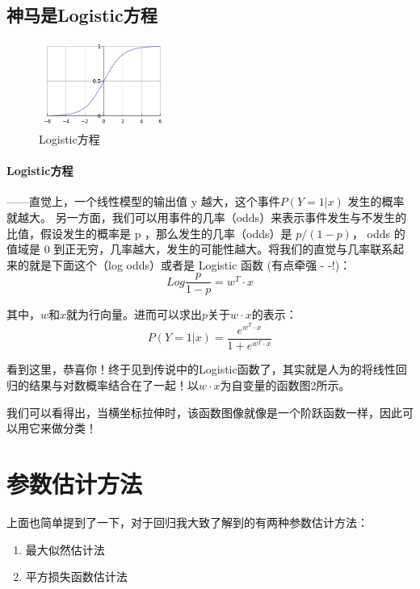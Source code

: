 \documentclass[a4paper, 11pt, UTF8]{ctexart} %
\begin{document}


\subsection{神马是Logistic方程}

\begin{figure}[H]
\centering
\includegraphics[width=0.38\textwidth,height=0.38\textwidth]{2.png}
\caption{Logistic方程}
\end{figure}
\paragraph{Logistic方程}——直觉上，一个线性模型的输出值 y 越大，这个事件$ P(Y=1|x) $ 发生的概率就越大。 另一方面，我们可以用事件的几率（odds）来表示事件发生与不发生的比值，假设发生的概率是 p ，那么发生的几率（odds）是 $p/(1-p) $， odds 的值域是 0 到正无穷，几率越大，发生的可能性越大。将我们的直觉与几率联系起来的就是下面这个（log odds）或者是 Logistic 函数 (有点牵强 - -!)：
$$ Log\frac{p}{1-p} =  w^T \cdot x  $$

其中，$w$和$x$就为行向量。进而可以求出$p$关于$w \cdot x$的表示：
$$ P(Y=1|x)  = \frac{e^{w^T \cdot x}}{1+e^{w^T \cdot x}}$$

看到这里，恭喜你！终于见到传说中的Logistic函数了，其实就是人为的将线性回归的结果与对数概率结合在了一起！以$w \cdot x$为自变量的函数图2所示。

我们可以看得出，当横坐标拉伸时，该函数图像就像是一个阶跃函数一样，因此可以用它来做分类！

\section{参数估计方法}

上面也简单提到了一下，对于回归我大致了解到的有两种参数估计方法：
\begin{enumerate}
\item 最大似然估计法
\item 平方损失函数估计法
\end{enumerate}
\end{document}
